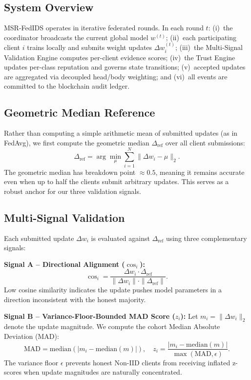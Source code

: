 \documentclass[conference]{IEEEtran}
\begin{document}
\subsection{System Overview}
MSR-FedIDS operates in iterative federated rounds. In each round $t$: (i)~the coordinator broadcasts the current global model $w^{(t)}$; (ii)~each participating client $i$ trains locally and submits weight updates $\Delta w_i^{(t)}$; (iii)~the Multi-Signal Validation Engine computes per-client evidence scores; (iv)~the Trust Engine updates per-class reputation and governs state transitions; (v)~accepted updates are aggregated via decoupled head/body weighting; and (vi)~all events are committed to the blockchain audit ledger.

\subsection{Geometric Median Reference}
Rather than computing a simple arithmetic mean of submitted updates (as in FedAvg), we first compute the geometric median $\Delta_{\text{ref}}$ over all client submissions:
\begin{equation}
\Delta_{\text{ref}} = \arg\min_{\mu} \sum_{i=1}^{N} \| \Delta w_i - \mu \|_2.
\label{eq:geomed}
\end{equation}
The geometric median has breakdown point $\approx 0.5$, meaning it remains accurate even when up to half the clients submit arbitrary updates. This serves as a robust anchor for our three validation signals.

\subsection{Multi-Signal Validation}
Each submitted update $\Delta w_i$ is evaluated against $\Delta_{\text{ref}}$ using three complementary signals:

\textbf{Signal A -- Directional Alignment ($\cos_i$):}
\begin{equation}
\cos_i = \frac{\Delta w_i \cdot \Delta_{\text{ref}}}{\|\Delta w_i\| \cdot \|\Delta_{\text{ref}}\|}.
\label{eq:cosine}
\end{equation}
Low cosine similarity indicates the update pushes model parameters in a direction inconsistent with the honest majority.

\textbf{Signal B -- Variance-Floor-Bounded MAD Score ($z_i$):}
Let $m_i = \|\Delta w_i\|_2$ denote the update magnitude. We compute the cohort Median Absolute Deviation (MAD):
\begin{equation}
\text{MAD} = \text{median}(|m_i - \text{median}(m)|), \quad z_i = \frac{|m_i - \text{median}(m)|}{\max(\text{MAD}, \epsilon)}.
\label{eq:mad}
\end{equation}
The variance floor $\epsilon$ prevents honest Non-IID clients from receiving inflated z-scores when update magnitudes are naturally concentrated.
\end{document}
